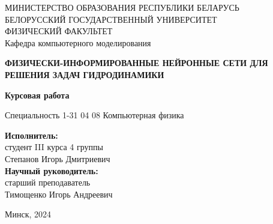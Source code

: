 \thispagestyle{empty}

\begin{center}
    МИНИСТЕРСТВО ОБРАЗОВАНИЯ РЕСПУБЛИКИ БЕЛАРУСЬ \\ 
    БЕЛОРУССКИЙ ГОСУДАРСТВЕННЫЙ УНИВЕРСИТЕТ \\ 
    ФИЗИЧЕСКИЙ ФАКУЛЬТЕТ \\
    Кафедра компьютерного моделирования
\end{center}

\vspace{100pt}

\begin{center}
    \textbf{ФИЗИЧЕСКИ-ИНФОРМИРОВАННЫЕ НЕЙРОННЫЕ СЕТИ ДЛЯ РЕШЕНИЯ ЗАДАЧ ГИДРОДИНАМИКИ}
    
    \hspace{10mm}
    \textbf{Курсовая работа}
    \hspace{10mm}
    
    Специальность 1-31 04 08 Компьютерная физика
\end{center}

\vfill

\begin{flushright}
    \textbf{Исполнитель:} \\
    студент III курса 4 группы \\
    Степанов Игорь Дмитриевич \\
    \vspace{10mm}    
    \textbf{Научный руководитель:} \\
    старший преподаватель \\
    Тимощенко Игорь Андреевич
\end{flushright}

\vfill

\begin{center}
    Минск, 2024
\end{center}